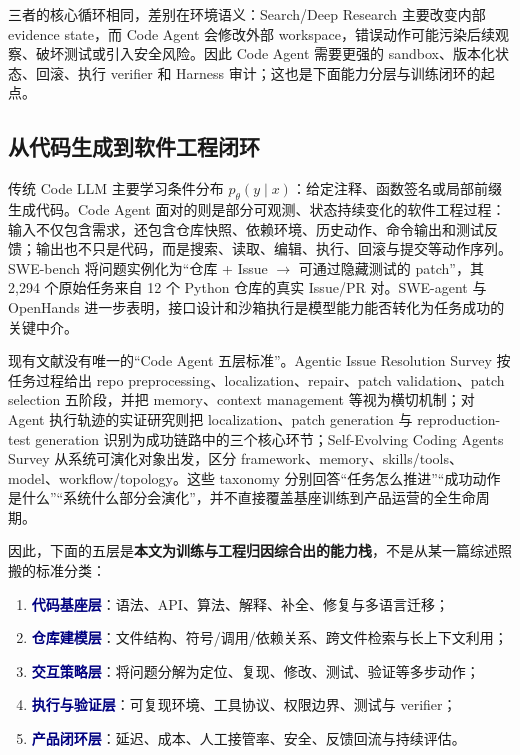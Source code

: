 \documentclass[10pt,a4paper,UTF8,fontset=none]{ctexart}
\newcommand{\stage}[1]{\textcolor{Navy}{\textbf{#1}}}
\begin{document}
三者的核心循环相同，差别在环境语义：Search/Deep Research 主要改变内部 evidence state，而 Code Agent 会修改外部 workspace，错误动作可能污染后续观察、破坏测试或引入安全风险。因此 Code Agent 需要更强的 sandbox、版本化状态、回滚、执行 verifier 和 Harness 审计；这也是下面能力分层与训练闭环的起点。

\subsection{从代码生成到软件工程闭环}

传统 Code LLM 主要学习条件分布 $p_\theta(y\mid x)$：给定注释、函数签名或局部前缀生成代码。Code Agent 面对的则是部分可观测、状态持续变化的软件工程过程：输入不仅包含需求，还包含仓库快照、依赖环境、历史动作、命令输出和测试反馈；输出也不只是代码，而是搜索、读取、编辑、执行、回滚与提交等动作序列。SWE-bench 将问题实例化为“仓库 + Issue $\rightarrow$ 可通过隐藏测试的 patch”，其 2,294 个原始任务来自 12 个 Python 仓库的真实 Issue/PR 对\cite{zh:jimenez2024swebench}。SWE-agent 与 OpenHands 进一步表明，接口设计和沙箱执行是模型能力能否转化为任务成功的关键中介\cite{zh:yang2024sweagent,zh:wang2024openhands}。

现有文献没有唯一的“Code Agent 五层标准”。Agentic Issue Resolution Survey 按任务过程给出 repo preprocessing、localization、repair、patch validation、patch selection 五阶段，并把 memory、context management 等视为横切机制\cite{zh:jiang2025agentsurvey}；对 Agent 执行轨迹的实证研究则把 localization、patch generation 与 reproduction-test generation 识别为成功链路中的三个核心环节\cite{zh:ceka2025traceability}；Self-Evolving Coding Agents Survey 从系统可演化对象出发，区分 framework、memory、skills/tools、model、workflow/topology\cite{zh:zhou2026selfevolving}。这些 taxonomy 分别回答“任务怎么推进”“成功动作是什么”“系统什么部分会演化”，并不直接覆盖基座训练到产品运营的全生命周期。

因此，下面的五层是\textbf{本文为训练与工程归因综合出的能力栈}，不是从某一篇综述照搬的标准分类：

\begin{enumerate}
  \item \stage{代码基座层}：语法、API、算法、解释、补全、修复与多语言迁移；
  \item \stage{仓库建模层}：文件结构、符号/调用/依赖关系、跨文件检索与长上下文利用；
  \item \stage{交互策略层}：将问题分解为定位、复现、修改、测试、验证等多步动作；
  \item \stage{执行与验证层}：可复现环境、工具协议、权限边界、测试与 verifier；
  \item \stage{产品闭环层}：延迟、成本、人工接管率、安全、反馈回流与持续评估。
\end{enumerate}
\end{document}
